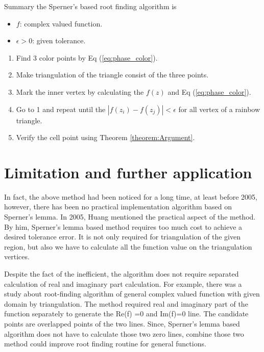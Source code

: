 \documentclass[a4paper,12pt]{article}
\begin{document}
Summary the Sperner's based root finding algorithm is

\begin{itemize}
    \item $f$: complex valued function.
    \item $\epsilon >0$: given tolerance. 
\end{itemize}

\begin{enumerate}
    \item Find 3 color points by Eq (\ref{eq:phase_color}).
    \item Make triangulation of the triangle consist of the three points.
    \item Mark the inner vertex by calculating the $f(z)$ and Eq (\ref{eq:phase_color}).
    \item Go to 1 and repeat until the $|f(z_i) - f(z_j)| < \epsilon$ for all vertex of a rainbow triangle.
    \item Verify the cell point using Theorem \ref{theorem:Argument}.
\end{enumerate}


\section{Limitation and further application}

In fact, the above method had been noticed for a long time,
at least before 2005, however, there has been no practical implementation algorithm based on 
Sperner's lemma. 
In 2005, Huang mentioned the practical aspect of the method. 
By him, Sperner's lemma based method requires too much cost
to achieve a desired tolerance error. 
It is not only required for triangulation of the given region,
but also we have to calculate all the function value on the triangulation vertices.

Despite the fact of the inefficient, 
the algorithm does not require 
separated calculation of real and imaginary part calculation.
For example, there was a study about root-finding algorithm
of general complex valued function with given domain by triangulation\cite{10.1145/2699457}.
The method required real and imaginary part of the function separately
to generate the Re(f) =0 and Im(f)=0 line.
The candidate points are overlapped points of the two lines.
Since, Sperner's lemma based algorithm does not have to calculate 
those two zero lines, combine those two method could improve 
root finding routine for general functions.
\end{document}
